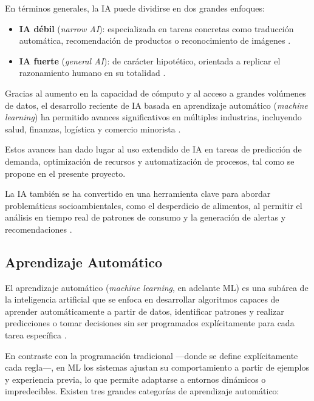 En términos generales, la IA puede dividirse en dos grandes enfoques:

\begin{itemize}
    \item \textbf{IA débil} (\textit{narrow AI}): especializada en tareas concretas como traducción automática, recomendación de productos o reconocimiento de imágenes \parencite{russell2021}.
    
    \item \textbf{IA fuerte} (\textit{general AI}): de carácter hipotético, orientada a replicar el razonamiento humano en su totalidad \parencite{russell2021}.
\end{itemize}

Gracias al aumento en la capacidad de cómputo y al acceso a grandes volúmenes de datos, el desarrollo reciente de IA basada en aprendizaje automático (\textit{machine learning}) ha permitido avances significativos en múltiples industrias, incluyendo salud, finanzas, logística y comercio minorista \parencite{jordan2015}.

Estos avances han dado lugar al uso extendido de IA en tareas de predicción de demanda, optimización de recursos y automatización de procesos, tal como se propone en el presente proyecto.

La IA también se ha convertido en una herramienta clave para abordar problemáticas socioambientales, como el desperdicio de alimentos, al permitir el análisis en tiempo real de patrones de consumo y la generación de alertas y recomendaciones \parencite{rolnick2019}.

\subsection{Aprendizaje Automático}

El aprendizaje automático (\textit{machine learning}, en adelante ML) es una subárea de la inteligencia artificial que se enfoca en desarrollar algoritmos capaces de aprender automáticamente a partir de datos, identificar patrones y realizar predicciones o tomar decisiones sin ser programados explícitamente para cada tarea específica \parencite{mitchell1997}.

En contraste con la programación tradicional —donde se define explícitamente cada regla—, en ML los sistemas ajustan su comportamiento a partir de ejemplos y experiencia previa, lo que permite adaptarse a entornos dinámicos o impredecibles. Existen tres grandes categorías de aprendizaje automático:

